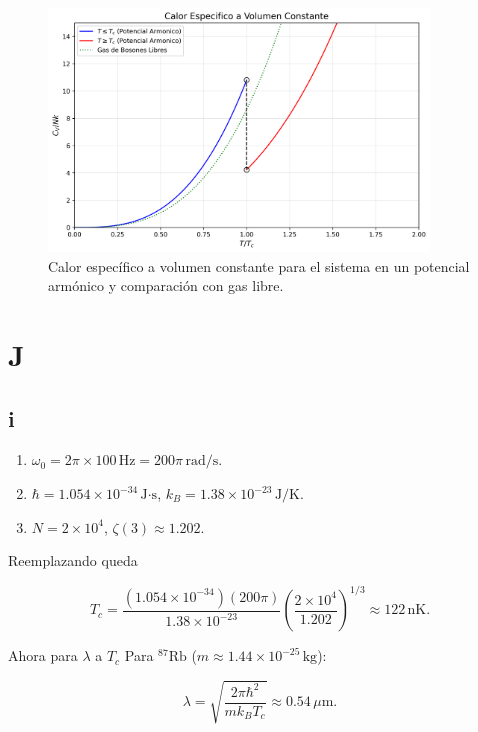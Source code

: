 \documentclass{report}
\begin{document}
\begin{figure}[H]
    \centering
    \includegraphics[width=0.9\textwidth]{./code/calor_especifico.png}
    \caption{Calor específico a volumen constante para el sistema en un potencial armónico y comparación con gas libre.}
    \label{fig:cv}
\end{figure}

\section{J}

\subsection{i}

\begin{enumerate}
   \item \( \omega_0 = 2\pi \times 100 \, \text{Hz} = 200\pi \, \text{rad/s} \).  
   \item \( \hbar = 1.054 \times 10^{-34} \, \text{J·s} \), \( k_B = 1.38 \times 10^{-23} \, \text{J/K} \).  
   \item \( N = 2 \times 10^4 \), \( \zeta(3) \approx 1.202 \).  
\end{enumerate}

Reemplazando queda

   \[
   T_c = \frac{(1.054 \times 10^{-34})(200\pi)}{1.38 \times 10^{-23}} \left( \frac{2 \times 10^4}{1.202} \right)^{1/3} \approx 122 \, \text{nK}.
   \]

Ahora para $\lambda$ a $T_c$
   Para \( ^{87}\text{Rb} \) (\( m \approx 1.44 \times 10^{-25} \, \text{kg} \)):  

   \[
   \lambda = \sqrt{\frac{2\pi \hbar^2}{m k_B T_c}} \approx 0.54 \, \mu\text{m}.
   \]
\end{document}

